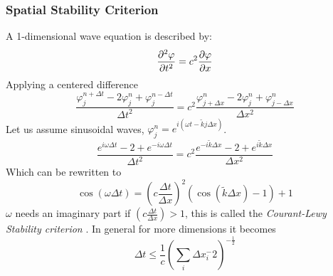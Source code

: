     \subsubsection{Spatial Stability Criterion}
        A 1-dimensional wave equation is described by:
        \begin{equation}
                \pdv[2]{\varphi}{t} = c^2 \pdv{\varphi}{x}
        \end{equation}
        Applying a centered difference
        \begin{equation}
            \frac{\varphi^{n + \Delta t}_{j} - 2 \varphi^{n}_{j} + \varphi^{n - \Delta t}_{j}}{\Delta t^2}
            =
            c^2\frac{\varphi^n_{j+\Delta x} - 2\varphi^n_{j} + \varphi^n_{j-\Delta x}}{\Delta x^2}
        \end{equation}
        Let us assume sinusoidal waves, \(\varphi^n_j = e^{i(\omega t  - \tilde{k}j\Delta x)}\).
        \begin{equation}
            \frac{e^{i\omega \Delta t} - 2 +e^{-i\omega \Delta t} }{\Delta t^2}
            = c^2 \frac{e^{-i\tilde k \Delta x} - 2 + e^{i\tilde k \Delta x}}{\Delta x ^2}
        \end{equation}
        Which can be rewritten to
        \begin{equation}
            \cos(\omega \Delta t) = \left(c\frac{\Delta t}{\Delta x}\right)^2\left(\cos(\tilde k \Delta x) - 1 \right) + 1
        \end{equation}
        \(\omega\) needs an imaginary part if \( \left(c\frac{\Delta t}{\Delta x}\right)>1\), this is called the \textit{Courant-Lewy Stability criterion}
        \citep{courant_uber_1869}. In general for more dimensions it becomes
        \begin{equation}
            \Delta t \leq \frac{1}{c} \left(\sum_i\Delta x_i^-2\right)^{-\frac{1}{2}}
        \end{equation}

